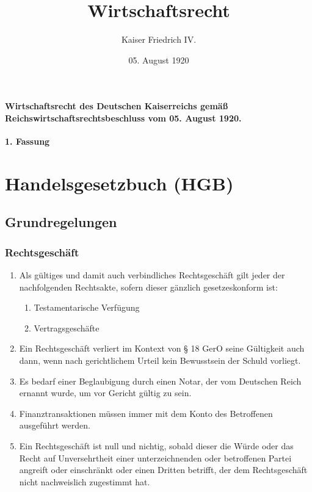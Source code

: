 \documentclass{article}
\title{Wirtschaftsrecht}
\author{Kaiser Friedrich IV.}
\date{05. August 1920}
\begin{document}
\maketitle
\vspace*{\fill}
\paragraph{Wirtschaftsrecht des Deutschen Kaiserreichs gemäß Reichswirtschaftsrechtsbeschluss vom 05. August 1920.}
\newpage
\newpage
{}
\vspace*{\fill}
\begin{Center}
\textbf{1. Fassung}
\vspace*{\fill}
\end{Center}
\newpage
\tableofcontents
\newpage
\section{Handelsgesetzbuch (HGB)}
\localtableofcontents
\subsection{Grundregelungen}
\subsubsection{Rechtsgeschäft}\label{rechtsg}
\begin{enumerate}[(1)]
    \item Als gültiges und damit auch verbindliches Rechtsgeschäft gilt jeder der nachfolgenden Rechtsakte, sofern dieser gänzlich gesetzeskonform ist:
    \begin{enumerate}[1.]
        \item Testamentarische Verfügung
        \item Vertragsgeschäfte
    \end{enumerate}
    \item Ein Rechtsgeschäft verliert im Kontext von § 18 GerO seine Gültigkeit auch dann, wenn nach gerichtlichem Urteil kein Bewusstsein der Schuld vorliegt.
    \item Es bedarf einer Beglaubigung durch einen Notar, der vom Deutschen Reich ernannt wurde, um vor Gericht gültig zu sein.
    \item Finanztransaktionen müssen immer mit dem Konto des Betroffenen ausgeführt werden.
    \item Ein Rechtsgeschäft ist null und nichtig, sobald dieser die Würde oder das Recht auf Unversehrtheit einer unterzeichnenden oder betroffenen Partei angreift oder einschränkt oder einen Dritten betrifft, der dem Rechtsgeschäft nicht nachweislich zugestimmt hat.
\end{enumerate}
\end{document}
